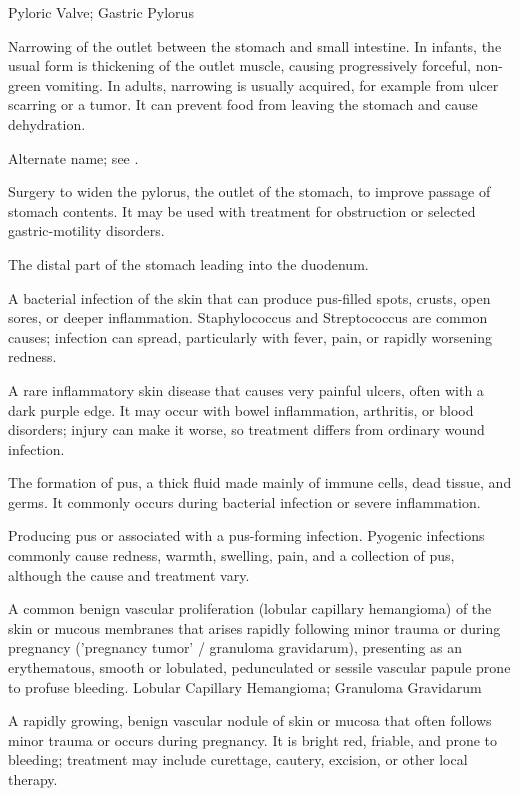 \synonyms
Pyloric Valve; Gastric Pylorus

 Narrowing of the outlet between the stomach and small intestine. In infants, the usual form is thickening of the outlet muscle, causing progressively forceful, non-green vomiting. In adults, narrowing is usually acquired, for example from ulcer scarring or a tumor. It can prevent food from leaving the stomach and cause dehydration.

 Alternate name; see .

 Surgery to widen the pylorus, the outlet of the stomach, to improve passage of stomach contents. It may be used with treatment for obstruction or selected gastric-motility disorders.

 The distal part of the stomach leading into the duodenum.

 A bacterial infection of the skin that can produce pus-filled spots, crusts, open sores, or deeper inflammation. Staphylococcus and Streptococcus are common causes; infection can spread, particularly with fever, pain, or rapidly worsening redness.

 A rare inflammatory skin disease that causes very painful ulcers, often with a dark purple edge. It may occur with bowel inflammation, arthritis, or blood disorders; injury can make it worse, so treatment differs from ordinary wound infection.

 The formation of pus, a thick fluid made mainly of immune cells, dead tissue, and germs. It commonly occurs during bacterial infection or severe inflammation.

 Producing pus or associated with a pus-forming infection. Pyogenic infections commonly cause redness, warmth, swelling, pain, and a collection of pus, although the cause and treatment vary.

 A common benign vascular proliferation (lobular capillary hemangioma) of the skin or mucous membranes that arises rapidly following minor trauma or during pregnancy ('pregnancy tumor' / granuloma gravidarum), presenting as an erythematous, smooth or lobulated, pedunculated or sessile vascular papule prone to profuse bleeding.
\synonyms
Lobular Capillary Hemangioma; Granuloma Gravidarum

 A rapidly growing, benign vascular nodule of skin or mucosa that often follows minor trauma or occurs during pregnancy. It is bright red, friable, and prone to bleeding; treatment may include curettage, cautery, excision, or other local therapy.

